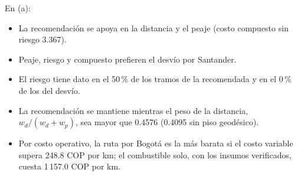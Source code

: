 En (a):
\begin{itemize}
\item La recomendación se apoya en la distancia y el peaje (costo compuesto sin riesgo 3.367).
\item Peaje, riesgo y compuesto prefieren el desvío por Santander.
\item El riesgo tiene dato en el 50\,\% de los tramos de la recomendada y en el 0\,\% de los del desvío.
\item La recomendación se mantiene mientras el peso de la distancia, $w_d/(w_d+w_p)$, sea mayor que 0.4576 (0.4095 sin piso geodésico).
\item Por costo operativo, la ruta por Bogotá es la más barata si el costo variable supera 248.8 COP por km; el combustible solo, con los insumos verificados, cuesta 1\,157.0 COP por km.
\end{itemize}
